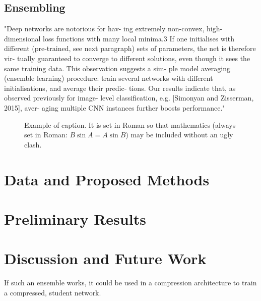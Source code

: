 \documentclass[10pt,twocolumn,letterpaper]{article}
\begin{document}
\subsection{Ensembling}
"Deep networks are notorious for hav- ing extremely non-convex, high-dimensional loss functions with many local minima.3 If one initialises with different (pre-trained, see next paragraph) sets of parameters, the net is therefore vir- tually guaranteed to converge to different solutions, even though it sees the same training data. This observation suggests a sim- ple model averaging (ensemble learning) procedure: train several networks with different initialisations, and average their predic- tions. Our results indicate that, as observed previously for image- level classification, e.g. [Simonyan and Zisserman, 2015], aver- aging multiple CNN instances further boosts performance." \cite{marmanis2016semantic}


\begin{figure}[t]
\begin{center}
\fbox{\rule{0pt}{2in} \rule{0.9\linewidth}{0pt}}
\end{center}
   \caption{Example of caption.  It is set in Roman so that mathematics
   (always set in Roman: $B \sin A = A \sin B$) may be included without an
   ugly clash.}
\label{fig:long}
\label{fig:onecol}
\end{figure}

\section{Data and Proposed Methods}

\section{Preliminary Results}

\section{Discussion and Future Work}

If such an ensemble works, it could be used in a compression architecture to train a compressed, student network.
{\small


}
\end{document}
